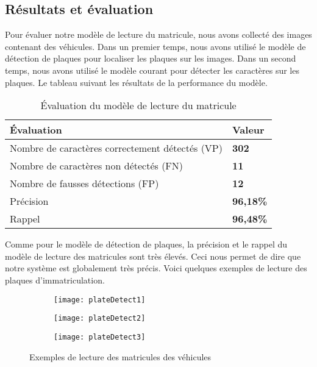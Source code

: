     \subsection{Résultats et évaluation}
    Pour évaluer notre modèle de lecture du matricule, nous avons collecté des images contenant des véhicules. Dans un premier temps, nous avons utilisé le modèle de détection de plaques pour localiser les plaques sur les images. Dans un second temps, nous avons utilisé le modèle courant pour détecter les caractères sur les plaques. Le tableau suivant les résultats de la performance du modèle.
    \begin{table}[H]
        \centering
        \begin{tabular}{|l|l|}
            \hline
            \rowcolor{Gray}
            \textbf{Évaluation} & \textbf{Valeur} \\ \hline
            Nombre de caractères correctement détectés (VP) & \textbf{302} \\ \hline
            Nombre de caractères non détectés (FN) & \textbf{11} \\ \hline
            Nombre de fausses détections (FP) & \textbf{12} \\ \hline
            Précision & \textbf{96,18\%} \\ \hline
            Rappel & \textbf{96,48\%} \\ \hline
        \end{tabular}
        \caption{Évaluation du modèle de lecture du matricule}
    \end{table}
    Comme pour le modèle de détection de plaques, la précision et le rappel du modèle de lecture des matricules sont très élevés. Ceci nous permet de dire que notre système est globalement très précis. Voici quelques exemples de lecture des plaques d'immatriculation.
    \begin{figure}[H]
        \begin{subfigure}{0.3\textwidth}
            \centering
            \texttt{[image: plateDetect1]}
        \end{subfigure}
        \hfill
        \begin{subfigure}{0.3\textwidth}
            \centering
            \texttt{[image: plateDetect2]}
        \end{subfigure}
        \hfill
        \begin{subfigure}{0.3\textwidth}
            \centering
            \texttt{[image: plateDetect3]}
        \end{subfigure}
        \caption{Exemples de lecture des matricules des véhicules}
    \end{figure}
